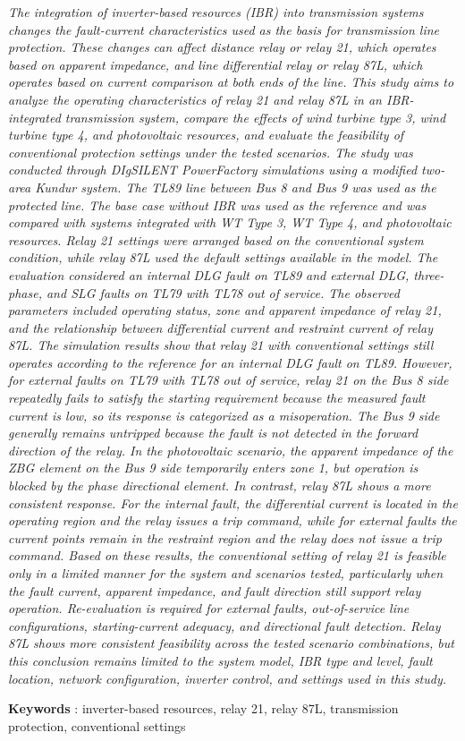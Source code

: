 \textit{
The integration of inverter-based resources (IBR) into transmission systems changes the fault-current characteristics used as the basis for transmission line protection. These changes can affect distance relay or relay 21, which operates based on apparent impedance, and line differential relay or relay 87L, which operates based on current comparison at both ends of the line. This study aims to analyze the operating characteristics of relay 21 and relay 87L in an IBR-integrated transmission system, compare the effects of wind turbine type 3, wind turbine type 4, and photovoltaic resources, and evaluate the feasibility of conventional protection settings under the tested scenarios. The study was conducted through DIgSILENT PowerFactory simulations using a modified two-area Kundur system. The TL89 line between Bus 8 and Bus 9 was used as the protected line. The base case without IBR was used as the reference and was compared with systems integrated with WT Type 3, WT Type 4, and photovoltaic resources. Relay 21 settings were arranged based on the conventional system condition, while relay 87L used the default settings available in the model. The evaluation considered an internal DLG fault on TL89 and external DLG, three-phase, and SLG faults on TL79 with TL78 out of service. The observed parameters included operating status, zone and apparent impedance of relay 21, and the relationship between differential current and restraint current of relay 87L. The simulation results show that relay 21 with conventional settings still operates according to the reference for an internal DLG fault on TL89. However, for external faults on TL79 with TL78 out of service, relay 21 on the Bus 8 side repeatedly fails to satisfy the starting requirement because the measured fault current is low, so its response is categorized as a misoperation. The Bus 9 side generally remains untripped because the fault is not detected in the forward direction of the relay. In the photovoltaic scenario, the apparent impedance of the ZBG element on the Bus 9 side temporarily enters zone 1, but operation is blocked by the phase directional element. In contrast, relay 87L shows a more consistent response. For the internal fault, the differential current is located in the operating region and the relay issues a trip command, while for external faults the current points remain in the restraint region and the relay does not issue a trip command. Based on these results, the conventional setting of relay 21 is feasible only in a limited manner for the system and scenarios tested, particularly when the fault current, apparent impedance, and fault direction still support relay operation. Re-evaluation is required for external faults, out-of-service line configurations, starting-current adequacy, and directional fault detection. Relay 87L shows more consistent feasibility across the tested scenario combinations, but this conclusion remains limited to the system model, IBR type and level, fault location, network configuration, inverter control, and settings used in this study.
}

\noindent\textbf{Keywords} : inverter-based resources, relay 21, relay 87L, transmission protection, conventional settings
